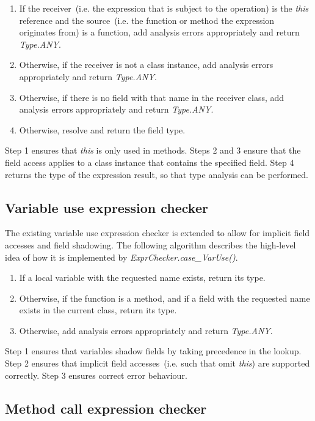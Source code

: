 \documentclass[]{tukportfolio}
\begin{document}
\begin{enumerate}
  \item If the receiver~(i.e. the expression that is subject to the operation) is the \textit{this} reference and the source~(i.e. the function or method the expression originates from) is a function, add analysis errors appropriately and return \textit{Type.ANY}.
  \item Otherwise, if the receiver is not a class instance, add analysis errors appropriately and return \textit{Type.ANY}.
  \item Otherwise, if there is no field with that name in the receiver class, add analysis errors appropriately and return \textit{Type.ANY}.
  \item Otherwise, resolve and return the field type.
\end{enumerate}

Step 1 ensures that \textit{this} is only used in methods. Steps 2 and 3 ensure that the field access applies to a class instance that contains the specified field. Step 4 returns the type of the expression result, so that type analysis can be performed.

\subsection{Variable use expression checker}

The existing variable use expression checker is extended to allow for implicit field accesses and field shadowing. The following algorithm describes the high-level idea of how it is implemented by \textit{ExprChecker.case\_VarUse()}.

\begin{enumerate}
  \item If a local variable with the requested name exists, return its type.
  \item Otherwise, if the function is a method, and if a field with the requested name exists in the current class, return its type.
  \item Otherwise, add analysis errors appropriately and return \textit{Type.ANY}.
\end{enumerate}

Step 1 ensures that variables shadow fields by taking precedence in the lookup. Step 2 ensures that implicit field accesses~(i.e. such that omit \textit{this}) are supported correctly. Step 3 ensures correct error behaviour.

\subsection{Method call expression checker}
\end{document}
